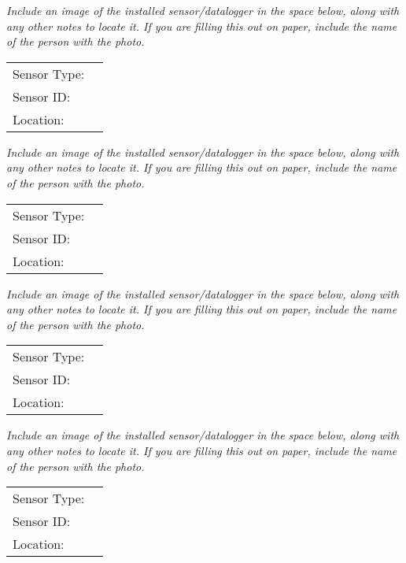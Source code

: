 \documentclass[./main.tex]{subfiles}
\begin{document}
\noindent \emph{Include an image of the installed sensor/datalogger in the space below,  along with any other notes to locate it.  If you are filling this out on paper, include the name of the person with the photo. }

\clearpage

\noindent\begin{tabularx}{\textwidth}{@{}lX@{}}
Sensor Type: & \hrulefill \\[2ex]
Sensor ID: & \hrulefill \\[2ex]
Location: & \hrulefill \\[2ex]
\end{tabularx}

\noindent \emph{Include an image of the installed sensor/datalogger in the space below,  along with any other notes to locate it.  If you are filling this out on paper, include the name of the person with the photo. }

\vspace{7cm}

\noindent\begin{tabularx}{\textwidth}{@{}lX@{}}
Sensor Type: & \hrulefill \\[2ex]
Sensor ID: & \hrulefill \\[2ex]
Location: & \hrulefill \\[2ex]
\end{tabularx}

\noindent \emph{Include an image of the installed sensor/datalogger in the space below,  along with any other notes to locate it.  If you are filling this out on paper, include the name of the person with the photo. }

\clearpage

\noindent\begin{tabularx}{\textwidth}{@{}lX@{}}
Sensor Type: & \hrulefill \\[2ex]
Sensor ID: & \hrulefill \\[2ex]
Location: & \hrulefill \\[2ex]
\end{tabularx}

\noindent \emph{Include an image of the installed sensor/datalogger in the space below,  along with any other notes to locate it.  If you are filling this out on paper, include the name of the person with the photo. }

\vspace{7cm}

\noindent\begin{tabularx}{\textwidth}{@{}lX@{}}
Sensor Type: & \hrulefill \\[2ex]
Sensor ID: & \hrulefill \\[2ex]
Location: & \hrulefill \\[2ex]
\end{tabularx}
\end{document}
